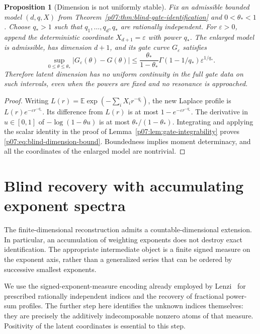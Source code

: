 \documentclass[11pt,letterpaper]{article}
\newtheorem{proposition}[theorem]{Proposition}
\theoremstyle{definition}
\theoremstyle{remark}
\newcommand{\E}{\mathbb E}
\newcommand{\1}{\mathbf 1}
\begin{document}
\begin{proposition}[Dimension is not uniformly stable]
\label{p07:prop:blind-dimension-instability}
Fix an admissible bounded model $(d,q,X)$ from
Theorem~\ref{p07:thm:blind-gate-identification} and $0<\theta_*<1$.
Choose $q_*>1$ such that $q_1,\ldots,q_d,q_*$ are rationally
independent. For $\varepsilon>0$, append the deterministic coordinate
$X_{d+1}=\varepsilon$ with power $q_*$. The enlarged model is admissible,
has dimension $d+1$, and its gate curve $G_\varepsilon$ satisfies
\begin{equation}\label{p07:eq:blind-dimension-bound}
 \sup_{0\leq\theta\leq\theta_*}
 |G_\varepsilon(\theta)-G(\theta)|
 \leq\frac{\theta_*}{1-\theta_*}
       \Gamma(1-1/q_*)\varepsilon^{1/q_*}.
\end{equation}
Therefore latent dimension has no uniform continuity in the full gate
data on such intervals, even when the powers are fixed and no resonance
is approached.
\end{proposition}
\begin{proof}
Writing $L(r)=\E\exp(-\sum_iX_i r^{-q_i})$, the new Laplace profile is
$L(r)e^{-\varepsilon r^{-q_*}}$. Its difference from $L(r)$ is at most
$1-e^{-\varepsilon r^{-q_*}}$. The derivative in $u\in[0,1]$ of
$-\log(1-\theta u)$ is at most $\theta_* /(1-\theta_*)$.
Integrating and applying the scalar identity in the proof of
Lemma~\ref{p07:lem:gate-integrability} proves
\eqref{p07:eq:blind-dimension-bound}. Boundedness implies moment determinacy,
and all the coordinates of the enlarged model are nontrivial.
\end{proof}

\section{Blind recovery with accumulating exponent spectra}
\label{p07:sec:countable-blind-gate}

The finite-dimensional reconstruction admits a countable-dimensional
extension. In particular, an accumulation of weighting exponents does not
destroy exact identification. The appropriate intermediate object is a
finite signed measure on the exponent axis, rather than a generalized
series that can be ordered by successive smallest exponents.

We use the signed-exponent-measure encoding already employed by
Lenzi~\cite[Lemmas~3.2--3.3]{Lenzi2026} for prescribed rationally independent
indices and the recovery of fractional power-sum profiles. The further
step here identifies the unknown indices themselves: they are precisely
the additively indecomposable nonzero atoms of that measure. Positivity
of the latent coordinates is essential to this step.
\end{document}
